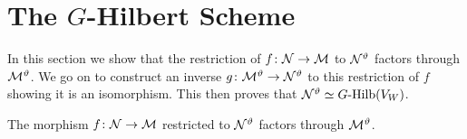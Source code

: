 \documentclass{amsart}
\theoremstyle{definition}
\newcommand\VW{V_W}
\begin{document}
\section{The $G$-Hilbert Scheme}
In this section we show that the restriction of $f \colon \mathcal{N} \rightarrow \mathcal{M}$ to $\mathcal{N}^\vartheta$ factors through $\mathcal{M}^\vartheta$.
We go on to construct an inverse $g \colon \mathcal{M}^\vartheta \rightarrow \mathcal{N}^\vartheta$ to this restriction of $f$ showing it is an isomorphism.
This then proves that $\cN^\vartheta \simeq G\text{-Hilb}(\VW)$.


\begin{proposition}
The morphism $f \colon \mathcal{N} \rightarrow \mathcal{M}$ restricted to $\mathcal{N}^\vartheta$ factors through $\mathcal{M}^\vartheta$.
\end{proposition}
\end{document}
